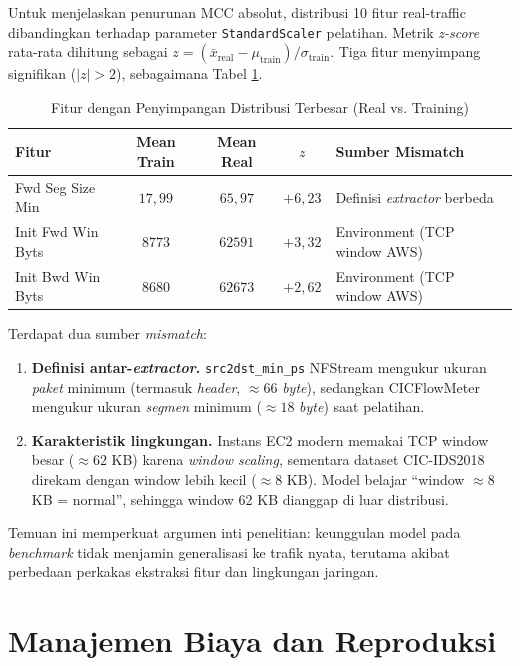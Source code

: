 \documentclass[11pt, a4paper]{article}
\begin{document}
Untuk menjelaskan penurunan MCC absolut, distribusi 10 fitur real-traffic dibandingkan terhadap parameter \texttt{StandardScaler} pelatihan. Metrik \textit{z-score} rata-rata dihitung sebagai $z = (\bar{x}_{\text{real}} - \mu_{\text{train}}) / \sigma_{\text{train}}$. Tiga fitur menyimpang signifikan ($|z| > 2$), sebagaimana Tabel \ref{tab:diag}.

\begin{table}[htbp]
\centering
\caption{Fitur dengan Penyimpangan Distribusi Terbesar (Real vs. Training)}
\label{tab:diag}
\small
\begin{tabularx}{\linewidth}{@{} l c c c X @{}}
\toprule
\textbf{Fitur} & \textbf{Mean Train} & \textbf{Mean Real} & \textbf{$z$} & \textbf{Sumber Mismatch} \\ \midrule
Fwd Seg Size Min & $17{,}99$ & $65{,}97$ & $+6{,}23$ & Definisi \textit{extractor} berbeda \\
Init Fwd Win Byts & $8773$ & $62591$ & $+3{,}32$ & Environment (TCP window AWS) \\
Init Bwd Win Byts & $8680$ & $62673$ & $+2{,}62$ & Environment (TCP window AWS) \\ \bottomrule
\end{tabularx}
\end{table}

\noindent Terdapat dua sumber \textit{mismatch}:
\begin{enumerate}[leftmargin=1.4cm]
    \item \textbf{Definisi antar-\textit{extractor}.} \texttt{src2dst\_min\_ps} NFStream mengukur ukuran \textit{paket} minimum (termasuk \textit{header}, $\approx 66$ \textit{byte}), sedangkan CICFlowMeter mengukur ukuran \textit{segmen} minimum ($\approx 18$ \textit{byte}) saat pelatihan.
    \item \textbf{Karakteristik lingkungan.} Instans EC2 modern memakai TCP window besar ($\approx 62$ KB) karena \textit{window scaling}, sementara dataset CIC-IDS2018 direkam dengan window lebih kecil ($\approx 8$ KB). Model belajar ``window $\approx 8$ KB = normal'', sehingga window 62 KB dianggap di luar distribusi.
\end{enumerate}

\noindent Temuan ini memperkuat argumen inti penelitian: keunggulan model pada \textit{benchmark} tidak menjamin generalisasi ke trafik nyata, terutama akibat perbedaan perkakas ekstraksi fitur dan lingkungan jaringan.

\section{Manajemen Biaya dan Reproduksi}
\end{document}
